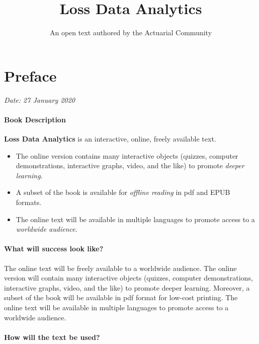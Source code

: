 \documentclass[]{book}
\title{Loss Data Analytics}
\author{An open text authored by the Actuarial Community}
\date{}
\providecommand{\tightlist}{%
  \setlength{\itemsep}{0pt}\setlength{\parskip}{0pt}}
\begin{document}
\maketitle

{
\setcounter{tocdepth}{2}
\tableofcontents
}
\chapter*{Preface}\label{preface}

\emph{Date: 27 January 2020}

\subsubsection*{Book Description}\label{book-description}

\textbf{Loss Data Analytics} is an interactive, online, freely available
text.

\begin{itemize}
\tightlist
\item
  The online version contains many interactive objects (quizzes,
  computer demonstrations, interactive graphs, video, and the like) to
  promote \emph{deeper learning}.
\item
  A subset of the book is available for \emph{offline reading} in pdf
  and EPUB formats.
\item
  The online text will be available in multiple languages to promote
  access to a \emph{worldwide audience}.
\end{itemize}

\subsubsection*{What will success look
like?}\label{what-will-success-look-like}

The online text will be freely available to a worldwide audience. The
online version will contain many interactive objects (quizzes, computer
demonstrations, interactive graphs, video, and the like) to promote
deeper learning. Moreover, a subset of the book will be available in pdf
format for low-cost printing. The online text will be available in
multiple languages to promote access to a worldwide audience.

\subsubsection*{How will the text be
used?}\label{how-will-the-text-be-used}
\end{document}
